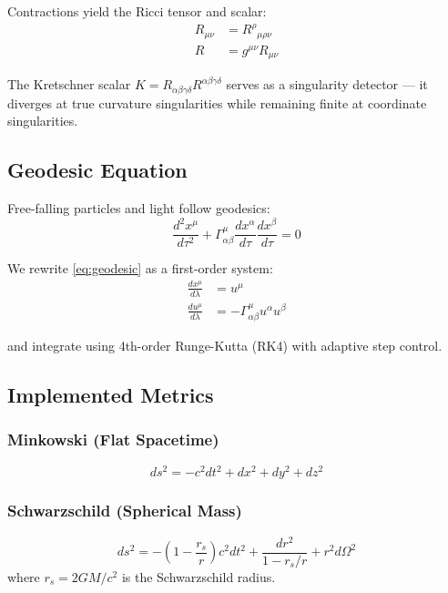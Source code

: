 \documentclass[12pt, a4paper]{article}
\begin{document}
Contractions yield the Ricci tensor and scalar:
\begin{align}
    R_{\mu\nu} &= R^\rho{}_{\mu\rho\nu} \\
    R &= g^{\mu\nu} R_{\mu\nu}
\end{align}

The Kretschner scalar $K = R_{\alpha\beta\gamma\delta} R^{\alpha\beta\gamma\delta}$
serves as a singularity detector — it diverges at true curvature singularities
while remaining finite at coordinate singularities.

\subsection{Geodesic Equation}

Free-falling particles and light follow geodesics:
\begin{equation}
    \frac{d^2 x^\mu}{d\tau^2} + \Gamma^\mu_{\alpha\beta}
    \frac{dx^\alpha}{d\tau} \frac{dx^\beta}{d\tau} = 0
    \label{eq:geodesic}
\end{equation}

We rewrite \eqref{eq:geodesic} as a first-order system:
\begin{align}
    \frac{dx^\mu}{d\lambda} &= u^\mu \\
    \frac{du^\mu}{d\lambda} &= -\Gamma^\mu_{\alpha\beta} u^\alpha u^\beta
\end{align}

and integrate using 4th-order Runge-Kutta (RK4) with adaptive step control.

\subsection{Implemented Metrics}

\subsubsection{Minkowski (Flat Spacetime)}
\begin{equation}
    ds^2 = -c^2 dt^2 + dx^2 + dy^2 + dz^2
\end{equation}

\subsubsection{Schwarzschild (Spherical Mass)}
\begin{equation}
    ds^2 = -\left(1 - \frac{r_s}{r}\right) c^2 dt^2
    + \frac{dr^2}{1 - r_s/r} + r^2 d\Omega^2
\end{equation}
where $r_s = 2GM/c^2$ is the Schwarzschild radius.
\end{document}
